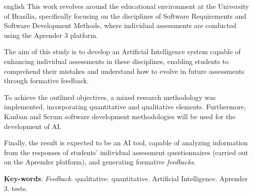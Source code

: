 \begin{resumo}[Abstract]
 \begin{otherlanguage*}{english}
   This work revolves around the educational environment at the University of Brasília, specifically focusing on the disciplines of Software Requirements and Software Development Methods, where individual assessments are conducted using the Aprender 3 platform.

    The aim of this study is to develop an Artificial Intelligence system capable of enhancing individual assessments in these disciplines, enabling students to comprehend their mistakes and understand how to evolve in future assessments through formative feedback.

    To achieve the outlined objectives, a mixed research methodology was implemented, incorporating quantitative and qualitative elements. Furthermore, Kanban and Scrum software development methodologies will be used for the development of AI.

    Finally, the result is expected to be an AI tool, capable of analyzing information from the responses of students' individual assessment questionnaires (carried out on the Aprender platform), and generating formative \textit{feedbacks}.
   \vspace{\onelineskip}
 
   \noindent 
   \textbf{Key-words}: \textit{Feedback}. qualitative. quantitative. Artificial Intelligence. Aprender 3. tests. 
 \end{otherlanguage*}
\end{resumo}
